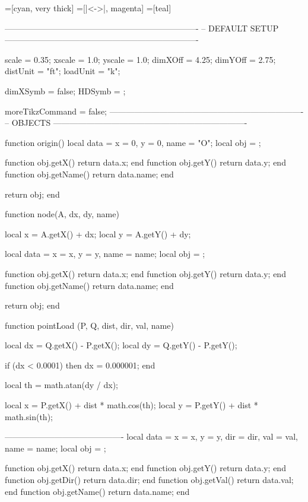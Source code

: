 
=[cyan, very thick]
=[|<->|, magenta]
=[teal]

\begin{luacode}

----------------------------------------------------------------------
-- DEFAULT SETUP
----------------------------------------------------------------------

    scale = 0.35;
    xscale = 1.0;
	yscale = 1.0;
	dimXOff = 4.25;
	dimYOff = 2.75;
	distUnit = "ft";
	loadUnit = "k";

	dimXSymb = false;
	HDSymb = {};
	
	moreTikzCommand = false;
----------------------------------------------------------------------
-- OBJECTS
----------------------------------------------------------------------

function origin()
	local data = {x = 0, y = 0, name = "O"};
	local obj = {};
	
	function obj.getX() return data.x; end
	function obj.getY() return data.y; end
	function obj.getName() return data.name; end
	
	return obj;
end

function node(A, dx, dy, name)

	local x = A.getX() + dx;
	local y = A.getY() + dy;
	
	local data = {x = x, y = y, name = name};
	local obj = {};
	
	function obj.getX() return data.x; end
	function obj.getY() return data.y; end
	function obj.getName() return data.name; end
	
	return obj;
end


function pointLoad (P, Q, dist, dir, val, name)
	
	local dx = Q.getX() - P.getX();
	local dy = Q.getY() - P.getY();
	
	if (dx < 0.0001) then dx = 0.000001; end

	local th = math.atan(dy / dx);
	
	local x = P.getX() + dist * math.cos(th);
	local y = P.getY() + dist * math.sin(th);
	
	-------------------------------------------
	local data = {x = x, y = y, dir = dir, val = val, name = name};
	local obj = {};
	
	function obj.getX() return data.x; end
	function obj.getY() return data.y; end
	function obj.getDir() return data.dir; end
	function obj.getVal() return data.val; end
	function obj.getName() return data.name; end
	

\end{luacode}
